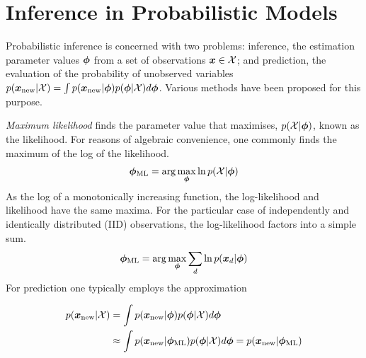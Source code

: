 

\newcommand \zd   { { \vv{z}_d } }
\newcommand \qfam { { \mathcal{Q} } }
\newcommand \xdat { { \mathcal{X} } }
\newcommand \zdat { { \mathcal{Z} } }
\newcommand \xnew { { \vv{x}_{\text{new}} } }
\newcommand \znew { { \vv{z}_{\text{new}} } }
\newcommand \param { { \vv{\phi} } }
\newcommand \ml[1] { { {#1}_{\text{ML}} } } 
\newcommand \map[1] { { {#1}_{\text{MAP}} } } 
\newcommand \quarter { { \oneover{4} } }
\newcommand \eighth { { \oneover{8} } }
\newcommand \fqt[1] { { \mathcal{F}\left( {#1} \right) } }
\newcommand \joint { { p(\xdat, \zdat | \Phi) } }
\newcommand \logjoint { { \ln \joint } }
\newcommand \exlogjoint[1] { { \ex{\logjoint}{{#1}} } }

\section{Inference in Probabilistic Models}
Probabilistic inference is concerned with two problems: inference, the estimation parameter values $\param$ from a set of observations $\vv{x} \in \xdat$; and prediction, the evaluation of the probability of unobserved variables $p(\xnew | \xdat) = \int p(\xnew | \param) p(\param | \xdat) d\param$. Various methods have been proposed for this purpose.

\emph{Maximum likelihood} finds the parameter value that maximises, $p(\xdat|\param)$, known as the likelihood. For reasons of algebraic convenience, one commonly finds the maximum of the log of the likelihood.\begin{align}
\ml{\param} = \arg \max_{\param} \ln p(\xdat | \param)
\end{align}
As the log of a monotonically increasing function, the log-likelihood and likelihood have the same maxima. For the particular case of independently and identically distributed (IID) observations, the log-likelihood factors into a simple sum.
\begin{align}
\ml{\param} = \arg \max_{\param} \sum_d \ln p(\xd | \param)
\end{align}
For prediction one typically employs the approximation

\begin{align}
p(\xnew | \xdat) 
&= \int p(\xnew | \param) p(\param | \xdat) d\param \\
&\approx \int p(\xnew | \ml{\param}) p(\param | \xdat) d\param
=  p(\xnew | \ml{\param})
\end{align}

